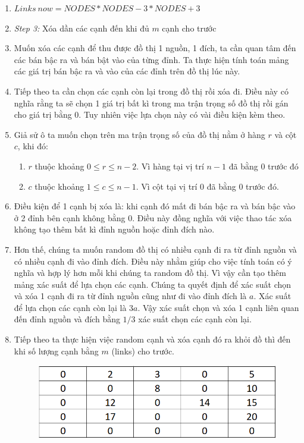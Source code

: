 \documentclass[a4paper]{article}
\begin{document}
\begin{enumerate}
    \item[] {$Links~now = NODES \ast NODES - 3 \ast NODES + 3$} 
    \item[] {\textit{Step 3:} Xóa dần các cạnh đến khi đủ $m$ cạnh cho trước} 
    \item[] {Muốn xóa các cạnh để thu được đồ thị 1 nguồn, 1 đích, ta cần quan tâm đến các bán bậc ra và bán bật vào của từng đỉnh. Ta thực hiện tính toán mảng các giá trị bán bậc ra và vào của các đỉnh trên đồ thị lúc này. }
    \item[] {Tiếp theo ta cần chọn các cạnh còn lại trong đồ thị rồi xóa đi. Điều này có nghĩa rằng ta sẽ chọn 1 giá trị bất kì trong ma trận trọng số đồ thị rồi gán cho giá trị bằng 0. Tuy nhiên việc lựa chọn này có vài điều kiện kèm theo. } 
    \item[] {Giả sử ô ta muốn chọn trên ma trận trọng số của đồ thị nằm ở hàng $r$ và cột $c$, khi đó: }
    \begin{enumerate}
        \item[\bullet] {$r$ thuộc khoảng $0 \leq r \leq n-2$. Vì hàng tại vị trí $n-1$ đã bằng 0 trước đó}
        \item[\bullet] {$c$ thuộc khoảng $1 \leq c \leq n-1$. Vì cột tại vị trí 0 đã bằng 0 trước đó.} 
    \end{enumerate}
    \item[] {Điều kiện để 1 cạnh bị xóa là: khi cạnh đó mất đi bán bậc ra và bán bậc vào ở 2 đỉnh bên cạnh không bằng 0. Điều này đồng nghĩa với việc thao tác xóa không tạo thêm bất kì đỉnh nguồn hoặc đỉnh đích nào. }
    \item[] {Hơn thế, chúng ta muốn random đồ thị có nhiều cạnh đi ra từ đỉnh nguồn và có nhiều cạnh đi vào đỉnh đích. Điều này nhằm giúp cho việc tính toán có ý nghĩa và hợp lý hơn mỗi khi chúng ta random đồ thị. Vì vậy cần tạo thêm mảng xác suất để lựa chọn các cạnh. Chúng ta quyết định để xác suất chọn và xóa 1 cạnh đi ra từ đỉnh nguồn cũng như đi vào đỉnh đích là $a$. Xác suất để lựa chọn các cạnh còn lại là $3a$. Vậy xác suất chọn và xóa 1 cạnh liên quan đến đỉnh nguồn và đích bằng $1/3$ xác suất chọn các cạnh còn lại. } 
    \item[] {Tiếp theo ta thực hiện việc random cạnh và xóa cạnh đó ra khỏi đồ thì đến khi số lượng cạnh bằng $m$ (links) cho trước. } 
    \begin{figure}[h]
        \centering
        \includegraphics[scale=0.8]{table_4.png}

\end{figure}
\end{enumerate}
\end{document}
